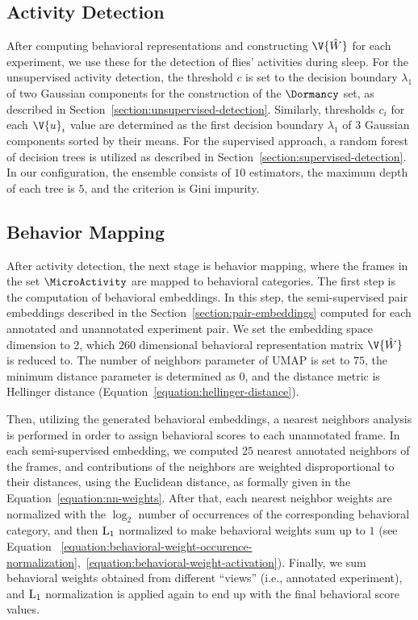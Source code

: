 \subsection{Activity Detection}
After computing behavioral representations and constructing $\V{\hat{W}}$ for each experiment, we use these for the detection of flies' activities during sleep.
For the unsupervised activity detection, the threshold $c$ is set to the decision boundary $\lambda_1$ of two Gaussian components for the construction of the $\Dormancy$ set, as described in Section~\ref{section:unsupervised-detection}.
Similarly, thresholds $c_i$ for each $\V{u}_i$ value are determined as the first decision boundary $\lambda_1$ of $3$ Gaussian components sorted by their means.
For the supervised approach, a random forest of decision trees \citep{breiman_random_2001} is utilized as described in Section~\ref{section:supervised-detection}.
In our configuration, the ensemble consists of $10$ estimators, the maximum depth of each tree is $5$, and the criterion is Gini impurity.

\subsection{Behavior Mapping}
After activity detection, the next stage is behavior mapping, where the frames in the set $\MicroActivity$ are mapped to behavioral categories.
The first step is the computation of behavioral embeddings.
In this step, the semi-supervised pair embeddings described in the Section~\ref{section:pair-embeddings} computed for each annotated and unannotated experiment pair.
We set the embedding space dimension to 2, which $260$ dimensional behavioral representation matrix $\V{\hat{W}}$ is reduced to.
The number of neighbors parameter of UMAP is set to $75$, the minimum distance parameter is determined as $0$, and the distance metric is Hellinger distance (Equation~\ref{equation:hellinger-distance}).

Then, utilizing the generated behavioral embeddings, a nearest neighbors analysis is performed in order to assign behavioral scores to each unannotated frame.
In each semi-supervised embedding, we computed $25$ nearest annotated neighbors of the frames, and contributions of the neighbors are weighted disproportional to their distances, using the Euclidean distance, as formally given in the Equation~\ref{equation:nn-weights}.
After that, each nearest neighbor weights are normalized with the $\log_2$ number of occurrences of the corresponding behavioral category, and then $\textnormal{L}_1$ normalized to make behavioral weights sum up to $1$ (see Equation ~\ref{equation:behavioral-weight-occurence-normalization},~\ref{equation:behavioral-weight-activation}).
Finally, we sum behavioral weights obtained from different ``views'' (i.e., annotated experiment), and $\textnormal{L}_1$ normalization is applied again to end up with the final behavioral score values.

